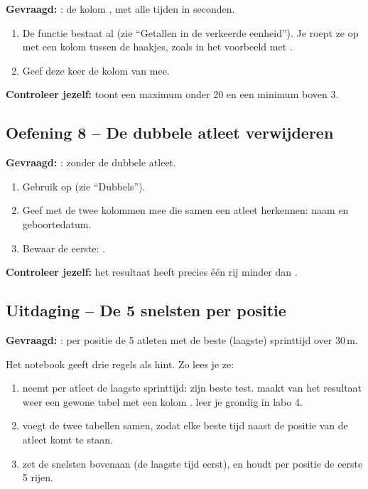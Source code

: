 \documentclass[11pt,a4paper]{article}
\begin{document}
\textbf{Gevraagd:} : de kolom
, met alle tijden in seconden.

\begin{enumerate}
  \item De functie  bestaat al (zie ``Getallen in
        de verkeerde eenheid''). Je roept ze op met een kolom tussen de
        haakjes, zoals in het voorbeeld met .
  \item Geef deze keer de kolom  van 
        mee.
\end{enumerate}

\textbf{Controleer jezelf:}  toont een
maximum onder 20 en een minimum boven 3.

\subsection*{Oefening 8 -- De dubbele atleet verwijderen}

\textbf{Gevraagd:} :  zonder
de dubbele atleet.

\begin{enumerate}
  \item Gebruik  op 
        (zie ``Dubbels'').
  \item Geef met  de twee kolommen mee die samen een
        atleet herkennen: naam en geboortedatum.
  \item Bewaar de eerste: .
\end{enumerate}

\textbf{Controleer jezelf:} het resultaat heeft precies één rij minder dan
.

\subsection*{Uitdaging -- De 5 snelsten per positie}

\textbf{Gevraagd:} : per positie de 5
atleten met de beste (laagste) sprinttijd over 30\,m.

Het notebook geeft drie regels als hint. Zo lees je ze:

\begin{enumerate}
  \item {}
        neemt per atleet de laagste sprinttijd: zijn beste test.
         maakt van het resultaat weer een gewone
        tabel met een kolom .  leer je
        grondig in labo 4.
  \item {} voegt
        de twee tabellen samen, zodat elke beste tijd naast de positie van
        de atleet komt te staan.
  \item {} zet de snelsten bovenaan
        (de laagste tijd eerst), en 
        houdt per positie de eerste 5 rijen.
\end{enumerate}
\end{document}
